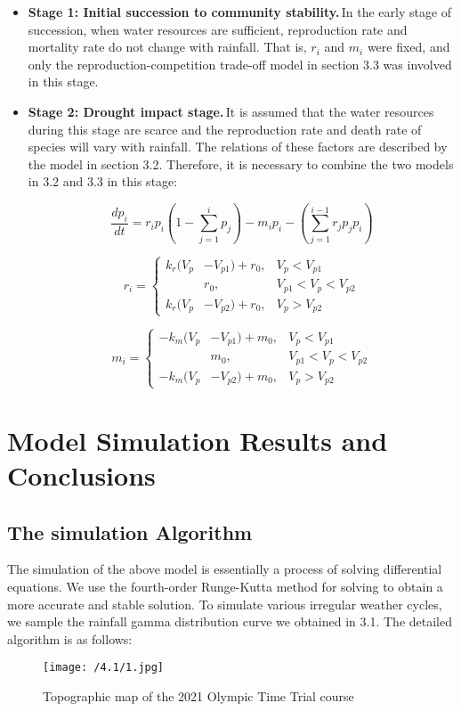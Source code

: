 \documentclass{mcmthesis}
\begin{document}
\begin{itemize}
	\item \textbf{Stage 1: Initial succession to community stability.}\,In the early stage of succession, when water resources are sufficient, reproduction rate and mortality rate do not change with rainfall. That is, $r_i$ and $m_i$ were fixed, and only the reproduction-competition trade-off model in section 3.3 was involved in this stage.
	
	\item \textbf{Stage 2: Drought impact stage.}\,It is assumed that the water resources during this stage are scarce and the reproduction rate and death rate of species will vary with rainfall. The relations of these factors are described by the model in section 3.2. Therefore, it is necessary to combine the two models in 3.2 and 3.3 in this stage:
	
\begin{equation}
	\label{eq9}
	\frac{dp_i}{dt}=r_ip_i(1-\sum_{j=1}^{i}{p_j})-m_ip_i-
	(\sum_{j=1}^{i-1}{r_jp_jp_i})
\end{equation}

\begin{equation}
	\label{eq10}
	r_i=\left\{
	\begin{aligned}
		k_{r}(V_p& -V_{p1})+r_0, & V_p<V_{p1} \\
		&r_0,&V_{p1}<V_p<V_{p2} \\
		k_{r}(V_p& -V_{p2})+r_0, & V_p>V_{p2} 
	\end{aligned}
	\right.
\end{equation}

\begin{equation}
	\label{eq11}
	m_i=\left\{
	\begin{aligned}
		-k_{m}(V_p& -V_{p1})+m_0, & V_p<V_{p1} \\
		&m_0,&V_{p1}<V_p<V_{p2} \\
		-k_{m}(V_p& -V_{p2})+m_0, & V_p>V_{p2} 
	\end{aligned}
	\right.
\end{equation}
	
\end{itemize}



\section{Model Simulation Results and Conclusions}

\subsection{The simulation Algorithm}
The simulation of the above model is essentially a process of solving differential equations. We use the fourth-order Runge-Kutta method for solving to obtain a more accurate and stable solution. To simulate various irregular weather cycles, we sample the rainfall gamma distribution curve we obtained in 3.1. The detailed algorithm is as follows: 
\begin{figure}[h]
	\centering
	\texttt{[image: /4.1/1.jpg]}
	\caption{Topographic map of the  2021 Olympic Time Trial course} 
	\label{algo}
\end{figure}
\end{document}
